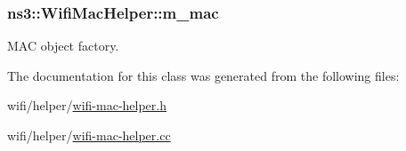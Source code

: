 \subsubsection[{\texorpdfstring{m\+\_\+mac}{m_mac}}]{ ns3\+::\+Wifi\+Mac\+Helper\+::m\+\_\+mac\hspace{0.3cm}{\ttfamily [protected]}}\hypertarget{classns3_1_1WifiMacHelper_a1c226e6af5625ee850dbf723e3c6ea2e}{}\label{classns3_1_1WifiMacHelper_a1c226e6af5625ee850dbf723e3c6ea2e}


M\+AC object factory. 



The documentation for this class was generated from the following files\+:\begin{DoxyCompactItemize}
\item 
wifi/helper/\hyperlink{wifi-mac-helper_8h}{wifi-\/mac-\/helper.\+h}\item 
wifi/helper/\hyperlink{wifi-mac-helper_8cc}{wifi-\/mac-\/helper.\+cc}\end{DoxyCompactItemize}
